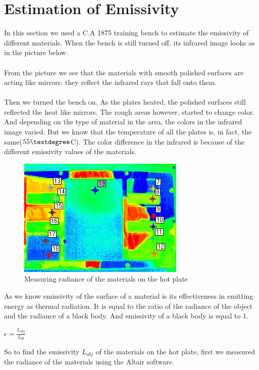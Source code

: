 \documentclass[english]{article}
\begin{document}
\section{Estimation of Emissivity}
In this section we used a C.A 1875 training bench to estimate the emissivity of different materials.
When the bench is still turned off, its infrared image looks as in the picture below.\\
\\
From the picture we see that the materials with smooth polished surfaces are acting like mirrors: they reflect the infrared rays that fall onto them.\\
\\
Then we turned the bench on.
As the plates heated, the polished surfaces still reflected the heat like mirrors.
The rough areas however, started to change color.
And depending on the type of material in the area, the colors in the infrared image varied.
But we know that the temperature of all the plates is, in fact, the same($55\textdegree$C).
The color difference in the infrared is because of the different emissivity values of the materials.\\
\begin{figure}[H]
	\centering
	\includegraphics[width=0.6\linewidth]{Pictures/emiss.jpg}
	\caption{Measuring radiance of the materials on the hot plate}
	\label{fig:six}
\end{figure}
As we know emissivity of the surface of a material is its effectiveness in emitting energy as thermal radiation.
It is equal to the ratio of the radiance of the object and the radiance of a black body. And emissivity of a black body is equal to 1.\\
\begin{center}
$\epsilon = \frac{L_{obj}}{L_{bb}} $
\end{center}
So to find the emissivity $L_{obj}$ of the materials on the hot plate, first we measured the radiance of the materials using the Altair software. 
\end{document}
